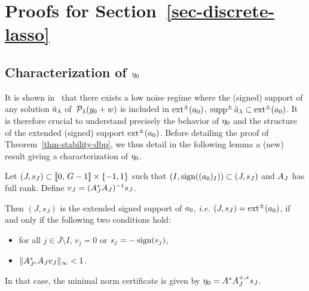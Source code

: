 \section{Proofs for Section~\ref{sec-discrete-lasso}}
\label{sec-discrete-lasso-proof}

\subsection{Characterization of $\eta_0$}

%
It is shown in~\cite{2013-duval-sparsespikes} that there exists a low noise regime where the (signed) support of any solution $\tilde{a}_{\lambda}$ of~$\mathcal{P}_\lambda(y_0+w)$ is included in $\operatorname{ext^{\pm}}(a_0)$, $\operatorname{supp^{\pm}} \tilde{a}_\lambda\subset \operatorname{ext^{\pm}}(a_0)$. It is therefore crucial to understand precisely the behavior of $\eta_0$ and the structure of the extended (signed) support  $\operatorname{ext^{\pm}}(a_0)$. 
%
Before detailing the proof of Theorem~\ref{thm-stability-dbp}, we thus detail in the following lemma a (new) result giving a characterization of $\eta_0$.

\begin{lem}\label{lem-eta0}
  Let $(J,s_J)\subset \llbracket 0,\,G-1 \rrbracket \times \{-1,1\}$ such that $(I,\operatorname{sign}((a_0)_I))\subset (J,s_J)$ and $A_J$ has full rank. Define $v_J=(A_J^*A_J)^{-1}s_J$.

  Then $(J,s_J)$ is the extended signed support of $a_0$, \textit{i.e.}  $(J,s_J)=\operatorname{ext^{\pm}}(a_0)$, if and only if  the following two conditions hold:
\begin{itemize}
  \item for all $j\in J\setminus I$, $v_j=0$ or $s_j = -\operatorname{sign}(v_j)$,
  \item $\|A_{J^c}^* A_J v_J\|_{\infty}<1$.
\end{itemize}
In that case, the minimal norm certificate is given by $\eta_0=A^*A_J^{+,*}s_J$.
\end{lem} 

